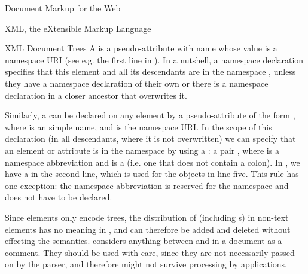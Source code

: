 \begin{tchapter}[id=markup-web]{Document Markup for the Web}
\begin{tsection}[id=xml]{XML, the eXtensible Markup Language}
\begin{tsubsection}[id=xml-tree,short=XML Documents as Trees]{XML Document Trees}
A {} is a pseudo-attribute with name {}
whose value is a namespace URI {} (see e.g. the first line in
{}). In a nutshell, a namespace declaration specifies that this element
and all its descendants are in the namespace {}, unless they have a
namespace declaration of their own or there is a namespace declaration in a closer
ancestor that overwrites it.

Similarly, a {} can be declared on any element by a
pseudo-attribute of the form
{}, where
{} is an {\xml} simple name, and {} is the namespace URI.  In
the scope of this declaration (in all descendants, where it is not overwritten) we can
specify that an element or attribute is in the namespace {} by using a
{}: a pair {\snippet{:}}, where
{} is a namespace abbreviation and {} is a
{} (i.e. one that does not contain a colon). In
{}, we have a {} in the second line,
which is used for the {\openmath} objects in line five. This rule has one exception: the
{} namespace abbreviation {} is reserved for
the {{\xml} namespace} and does not have to be declared.

Since {\xml} elements only encode trees, the distribution of {}
(including {s}) in non-text elements has no meaning in {\xml}, and can
therefore be added and deleted without effecting the semantics.  {\xml} considers anything
between {} and {\snippetin{-->}} in a document as a
comment.  They should be used with care, since they are not necessarily
passed on by the {\xml} parser, and therefore might not survive
processing by {\xml} applications.


\end{tsubsection}
\end{tsection}
\end{tchapter}
